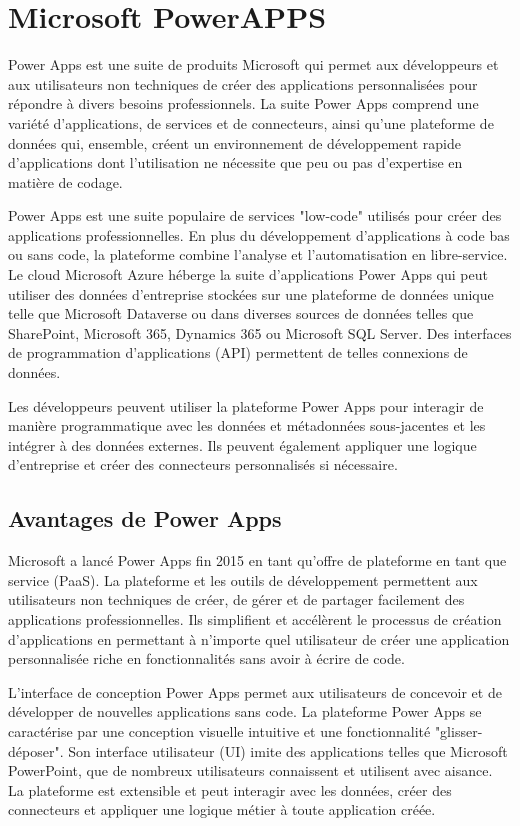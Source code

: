 \documentclass[a4paper, oneside, 12pt, final]{extreport}
\begin{document}
\section{Microsoft PowerAPPS}
Power Apps est une suite de produits Microsoft qui permet aux développeurs et aux utilisateurs non techniques de créer des applications personnalisées pour répondre à divers besoins professionnels. La suite Power Apps comprend une variété d'applications, de services et de connecteurs, ainsi qu'une plateforme de données qui, ensemble, créent un environnement de développement rapide d'applications dont l'utilisation ne nécessite que peu ou pas d'expertise en matière de codage.


Power Apps est une suite populaire de services "low-code" utilisés pour créer des applications professionnelles. En plus du développement d'applications à code bas ou sans code, la plateforme combine l'analyse et l'automatisation en libre-service. Le cloud Microsoft Azure héberge la suite d'applications Power Apps qui peut utiliser des données d'entreprise stockées sur une plateforme de données unique telle que Microsoft Dataverse ou dans diverses sources de données telles que SharePoint, Microsoft 365, Dynamics 365 ou Microsoft SQL Server. Des interfaces de programmation d'applications (API) permettent de telles connexions de données.


Les développeurs peuvent utiliser la plateforme Power Apps pour interagir de manière programmatique avec les données et métadonnées sous-jacentes et les intégrer à des données externes. Ils peuvent également appliquer une logique d'entreprise et créer des connecteurs personnalisés si nécessaire.

\subsection{Avantages de Power Apps}
Microsoft a lancé Power Apps fin 2015 en tant qu'offre de plateforme en tant que service (PaaS). La plateforme et les outils de développement permettent aux utilisateurs non techniques de créer, de gérer et de partager facilement des applications professionnelles. Ils simplifient et accélèrent le processus de création d'applications en permettant à n'importe quel utilisateur de créer une application personnalisée riche en fonctionnalités sans avoir à écrire de code.


L'interface de conception Power Apps permet aux utilisateurs de concevoir et de développer de nouvelles applications sans code.
La plateforme Power Apps se caractérise par une conception visuelle intuitive et une fonctionnalité "glisser-déposer". Son interface utilisateur (UI) imite des applications telles que Microsoft PowerPoint, que de nombreux utilisateurs connaissent et utilisent avec aisance. La plateforme est extensible et peut interagir avec les données, créer des connecteurs et appliquer une logique métier à toute application créée.
\end{document}
